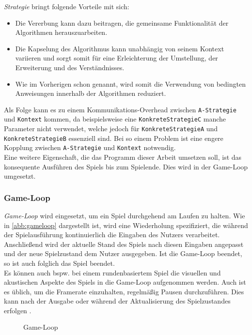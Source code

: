 \documentclass[12pt,a4paper,bibliography=totocnumbered,listof=totocnumbered]{article}
\begin{document}
\textit{Strategie} bringt folgende Vorteile mit sich: 
\begin{itemize}
\item Die Vererbung kann dazu beitragen, die gemeinsame Funktionalität der Algorithmen herauszuarbeiten.
\item Die Kapselung des Algorithmus kann unabhängig von seinem Kontext variieren und sorgt somit für eine Erleichterung der Umstellung, der Erweiterung und des Verständnisses.
\item Wie im Vorherigen schon genannt, wird somit die Verwendung von bedingten Anweisungen innerhalb der Algorithmen reduziert.
\end{itemize}
Als Folge kann es zu einem Kommunikations-Overhead zwischen \texttt{A-Strategie} und \texttt{Kontext} kommen, da beispielsweise eine \texttt{KonkreteStrategieC} manche Parameter nicht verwendet, welche jedoch für \texttt{KonkreteStrategieA} und \texttt{KonkreteStrategieB} essenziell sind. Bei so einem Problem ist eine engere Kopplung zwischen \texttt{A-Strategie} und \texttt{Kontext} notwendig.\\
Eine weitere Eigenschaft, die das Programm dieser Arbeit umsetzen soll, ist das konsequente Ausführen des Spiels bis zum Spielende. Dies wird in der Game-Loop umgesetzt.

\subsubsection{Game-Loop}
\emph{Game-Loop} wird eingesetzt, um ein Spiel durchgehend am Laufen zu halten. Wie in \autoref{abb:gameloop} dargestellt ist, wird eine Wiederholung spezifiziert, die während der Spielausführung kontinuierlich die Eingaben des Nutzers verarbeitet. Anschließend wird der aktuelle Stand des Spiels nach diesen Eingaben angepasst und der neue Spielzustand dem Nutzer ausgegeben. Ist die Game-Loop beendet, so ist auch folglich das Spiel beendet.\\Es können auch bspw. bei einem rundenbasiertem Spiel die visuellen und akustischen Aspekte des Spiels in die Game-Loop aufgenommen werden. Auch ist es üblich, um die Framerate einzuhalten, regelmäßig Pausen durchzuführen. Dies kann nach der Ausgabe oder während der Aktualisierung des Spielzustandes erfolgen \citep[Kapitel~9]{Nystrom.2014}.\\

\begin{figure}[h]
\centering
{}
\caption{Game-Loop \citep[In Anlehnung an][Kapitel~9]{Nystrom.2014}}
\label{abb:gameloop}
\end{figure}
\end{document}
